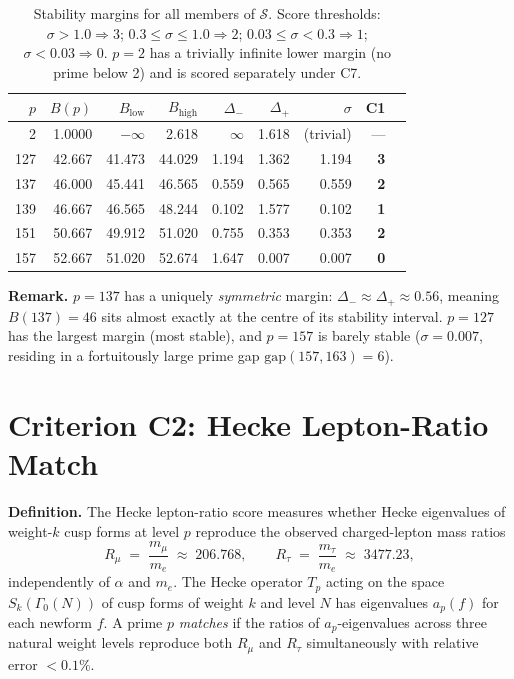 \documentclass[12pt,a4paper]{article}
\theoremstyle{definition}
\theoremstyle{remark}
\begin{document}
\begin{table}[h]
\centering
\caption{Stability margins for all members of $\mathcal{S}$.
         Score thresholds: $\sigma > 1.0 \Rightarrow 3$;\;
         $0.3 \leq \sigma \leq 1.0 \Rightarrow 2$;\;
         $0.03 \leq \sigma < 0.3 \Rightarrow 1$;\;
         $\sigma < 0.03 \Rightarrow 0$.
         $p=2$ has a trivially infinite lower margin (no prime below 2) and
         is scored separately under C7.}
\label{tab:spr:c1}
\begin{tabular}{rrrrrrrrc}
\toprule
$p$ & $B(p)$ & $B_{\mathrm{low}}$ & $B_{\mathrm{high}}$ & $\Delta_-$ & $\Delta_+$ & $\sigma$ & \textbf{C1} \\
\midrule
   2 & 1.0000 & $-\infty$ & 2.618 & $\infty$ & 1.618 & (trivial) & — \\
 127 & 42.667 & 41.473 & 44.029 & 1.194 & 1.362 & 1.194 & \textbf{3} \\
 137 & 46.000 & 45.441 & 46.565 & 0.559 & 0.565 & 0.559 & \textbf{2} \\
 139 & 46.667 & 46.565 & 48.244 & 0.102 & 1.577 & 0.102 & \textbf{1} \\
 151 & 50.667 & 49.912 & 51.020 & 0.755 & 0.353 & 0.353 & \textbf{2} \\
 157 & 52.667 & 51.020 & 52.674 & 1.647 & 0.007 & 0.007 & \textbf{0} \\
\bottomrule
\end{tabular}
\end{table}

\textbf{Remark.}
$p = 137$ has a uniquely \emph{symmetric} margin: $\Delta_- \approx \Delta_+ \approx 0.56$,
meaning $B(137) = 46$ sits almost exactly at the centre of its stability interval.
$p = 127$ has the largest margin (most stable), and $p = 157$ is barely stable
($\sigma = 0.007$, residing in a fortuitously large prime gap
$\text{gap}(157, 163) = 6$).

\section{Criterion C2: Hecke Lepton-Ratio Match}
\label{sec:spr:c2}

\textbf{Definition.}
The Hecke lepton-ratio score measures whether Hecke eigenvalues of
weight-$k$ cusp forms at level $p$ reproduce the observed charged-lepton
mass ratios
\[
  R_\mu \;=\; \frac{m_\mu}{m_e} \;\approx\; 206.768,
  \qquad
  R_\tau \;=\; \frac{m_\tau}{m_e} \;\approx\; 3477.23,
\]
independently of $\alpha$ and $m_e$.
The Hecke operator $T_p$ acting on the space $S_k(\Gamma_0(N))$ of cusp
forms of weight $k$ and level $N$ has eigenvalues $a_p(f)$ for each
newform $f$.  A prime $p$ \emph{matches} if the ratios of $a_p$-eigenvalues
across three natural weight levels reproduce both $R_\mu$ and $R_\tau$
simultaneously with relative error $< 0.1\%$.
\end{document}
